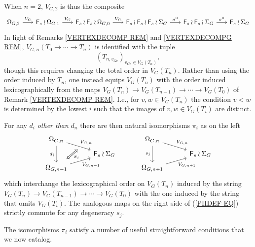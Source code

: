 \documentclass[a4paper,10pt]{article}%
\begin{document}
\begin{remark}\label{VGN REM}
When $n = 2$, $V_{G,2}$ is thus the composite
\[
\begin{tikzcd}[column sep =1.7em]
	\Omega_{G,2} \ar{r}{V_G} &
	\Fin_s \wr \Omega_{G,1} \ar{r}{V_G} &
	\Fin_s \wr \Fin_s \wr \Omega_{G,0} \ar{r}{V_G} &
	\Fin_s \wr \Fin_s \wr \Fin_s \wr \Sigma_{G} \ar{r}{\sigma^0} &
	\Fin_s \wr \Fin_s \wr \Sigma_{G} \ar{r}{\sigma^0} &
	\Fin_s \wr \Sigma_{G}
\end{tikzcd}
\]
In light of Remarks \ref{VERTEXDECOMP REM} and \ref{VERTEXDECOMPG REM}, 
$V_{G,n}(T_0 \to \cdots \to T_n)$ is identified with the tuple 
\begin{equation}\label{VGNISO EQ}
	(T_{n,v_{G e}})_{v_{G e} \in V_G(T_n)},
\end{equation}
though this requires changing the total order in $V_G(T_n)$. Rather than using the order induced by $T_n$, one instead equips 
$V_G(T_n)$ with the order induced lexicographically
from the maps 
$V_G(T_n) \to V_G(T_{n-1}) \to \cdots \to V_G(T_0)$ 
of Remark \ref{VERTEXDECOMP REM}. I.e., for 
$v,w \in V_G(T_n)$ the condition $v<w$ is determined by the lowest $i$ such that the images of $v,w \in V_G(T_i)$ are distinct.

For any $d_i$ \textit{other than} $d_n$ there are then natural isomorphisms $\pi_i$ as on the left
\begin{equation}\label{PIIDEF EQ}
\begin{tikzcd}[row sep=0.4em,column sep = 3em]
	\Omega_{G,n} \ar{dr}[name=F1]{V_{G,n}} \ar{dd}[swap]{d_i} &
&
	\Omega_{G,n} \ar{dr}{V_{G,n}} \ar{dd}[swap]{s_j} &
\\
	& \Fin_s \wr \Sigma_G &
	& \Fin_s \wr \Sigma_G 
\\
	|[alias=G2]|
	\Omega_{G,n-1}  \ar{ur}[swap]{V_{G,n-1}} & &
	\Omega_{G,n+1}  \ar{ur}[swap]{V_{G,n+1}} & 
\arrow[Leftrightarrow, from=F1, to=G2,shorten >=0.25cm,shorten <=0.25cm,"\pi_i"]
\end{tikzcd}
\end{equation}
which interchange the lexicographical order on $V_G(T_n)$
induced by the string
$V_G(T_n) \to V_G(T_{n-1}) \to \cdots \to V_G(T_0)$ 
with the one induced by the string that omits $V_G(T_i)$.
The analogous maps on the right side of 
(\ref{PIIDEF EQ})
strictly commute for any degeneracy $s_j$.
\end{remark}

The isomorphisms $\pi_i$ satisfy a number of useful straightforward conditions that we now catalog.
\end{document}
